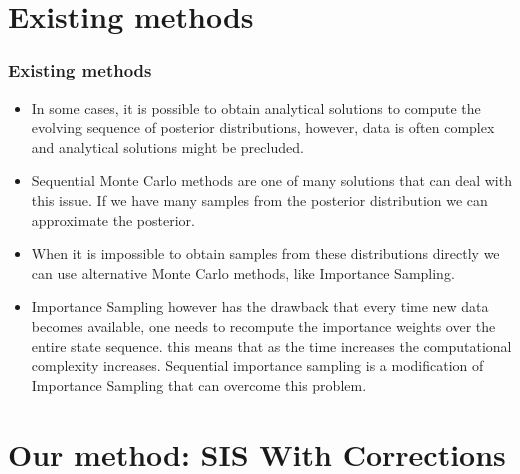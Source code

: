 \documentclass[9pt, xcolor={dvipsnames,svgnames,table}]{beamer}
\begin{document}
\section{Existing methods}

\begin{frame}
    \frametitle{Existing methods}
    \begin{itemize}
        \setlength\itemsep{2em}
        \item In some cases, it is possible to obtain analytical solutions to compute the evolving sequence of posterior distributions, however, data is often complex and analytical solutions might be precluded.
        \item Sequential Monte Carlo methods are one of many solutions that can deal with this issue. If we have many samples from the posterior distribution we can approximate the posterior. 
        \item When it is impossible to obtain samples from these distributions directly we can use alternative Monte Carlo methods, like Importance Sampling.
        \item Importance Sampling however has the drawback that every time new data becomes available, one needs to recompute the importance weights over the entire state sequence. this means that as the time increases the computational complexity increases. Sequential importance sampling is a modification of Importance Sampling that can overcome this problem.
    \end{itemize}
\end{frame}

\section{Our method: SIS With Corrections}
\end{document}
